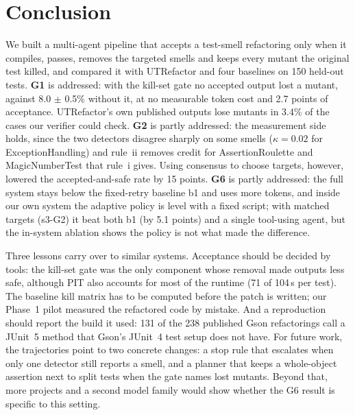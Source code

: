\section{Conclusion}\label{sec:conclusion}

We built a multi-agent pipeline that accepts a test-smell refactoring only when it compiles, passes, removes the targeted smells and keeps every mutant the original test killed, and compared it with UTRefactor and four baselines on 150 held-out tests.
\textbf{G1} is addressed: with the kill-set gate no accepted output lost a mutant, against 8.0 $\pm$ 0.5\% without it, at no measurable token cost and 2.7 points of acceptance. UTRefactor's own published outputs lose mutants in 3.4\% of the cases our verifier could check.
\textbf{G2} is partly addressed: the measurement side holds, since the two detectors disagree sharply on some smells ($\kappa=0.02$ for ExceptionHandling) and rule~ii removes credit for AssertionRoulette and MagicNumberTest that rule~i gives. Using consensus to choose targets, however, lowered the accepted-and-safe rate by 15 points.
\textbf{G6} is partly addressed: the full system stays below the fixed-retry baseline \textsf{b1} and uses more tokens, and inside our own system the adaptive policy is level with a fixed script; with matched targets (\textsf{s3-G2}) it beat both \textsf{b1} (by 5.1 points) and a single tool-using agent, but the in-system ablation shows the policy is not what made the difference.

Three lessons carry over to similar systems. Acceptance should be decided by tools: the kill-set gate was the only component whose removal made outputs less safe, although PIT also accounts for most of the runtime (71 of 104\,s per test). The baseline kill matrix has to be computed before the patch is written; our Phase~1 pilot measured the refactored code by mistake. And a reproduction should report the build it used: 131 of the 238 published Gson refactorings call a JUnit~5 method that Gson's JUnit~4 test setup does not have.
For future work, the trajectories point to two concrete changes: a stop rule that escalates when only one detector still reports a smell, and a planner that keeps a whole-object assertion next to split tests when the gate names lost mutants. Beyond that, more projects and a second model family would show whether the G6 result is specific to this setting.
